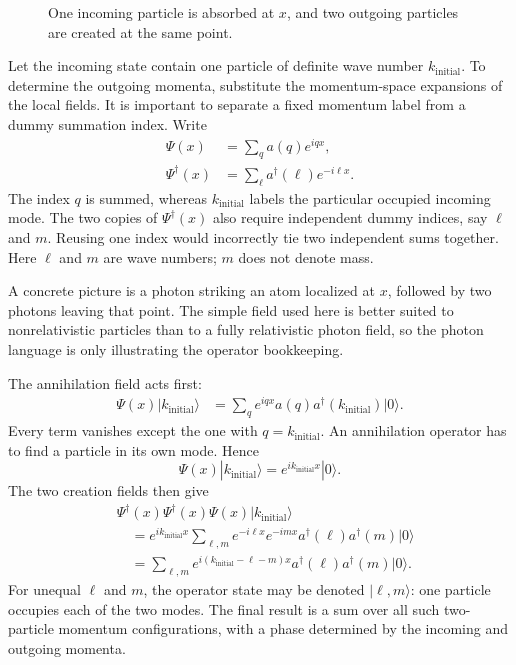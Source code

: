 \begin{figure}[t]
\centering
{}
\caption{One incoming particle is absorbed at \(x\), and two outgoing particles are created at the same point.}
\end{figure}

Let the incoming state contain one particle of definite wave number \(k_{\mathrm{initial}}\). To determine the outgoing momenta, substitute the momentum-space expansions of the local fields. It is important to separate a fixed momentum label from a dummy summation index. Write
\begin{align}
\Psi(x)&=\sum_q a(q)e^{iqx},\\
\Psi^\dagger(x)&=\sum_\ell a^\dagger(\ell)e^{-i\ell x}.
\end{align}
The index \(q\) is summed, whereas \(k_{\mathrm{initial}}\) labels the particular occupied incoming mode. The two copies of \(\Psi^\dagger(x)\) also require independent dummy indices, say \(\ell\) and \(m\). Reusing one index would incorrectly tie two independent sums together. Here \(\ell\) and \(m\) are wave numbers; \(m\) does not denote mass.

A concrete picture is a photon striking an atom localized at \(x\), followed by two photons leaving that point. The simple field used here is better suited to nonrelativistic particles than to a fully relativistic photon field, so the photon language is only illustrating the operator bookkeeping.

The annihilation field acts first:
\begin{align}
\Psi(x)|k_{\mathrm{initial}}\rangle
&=\sum_q e^{iqx}a(q)a^\dagger(k_{\mathrm{initial}})|0\rangle.
\end{align}
Every term vanishes except the one with \(q=k_{\mathrm{initial}}\). An annihilation operator has to find a particle in its own mode. Hence
\begin{equation}
\Psi(x)|k_{\mathrm{initial}}\rangle
=e^{ik_{\mathrm{initial}}x}|0\rangle.
\end{equation}
The two creation fields then give
\begin{align}
&\Psi^\dagger(x)\Psi^\dagger(x)\Psi(x)
|k_{\mathrm{initial}}\rangle
\\
&\quad=
e^{ik_{\mathrm{initial}}x}
\sum_{\ell,m}
e^{-i\ell x}e^{-imx}
a^\dagger(\ell)a^\dagger(m)|0\rangle
\\
&\quad=
\sum_{\ell,m}
e^{i(k_{\mathrm{initial}}-\ell-m)x}
a^\dagger(\ell)a^\dagger(m)|0\rangle.
\end{align}
For unequal \(\ell\) and \(m\), the operator state may be denoted \(|\ell,m\rangle\): one particle occupies each of the two modes. The final result is a sum over all such two-particle momentum configurations, with a phase determined by the incoming and outgoing momenta.

